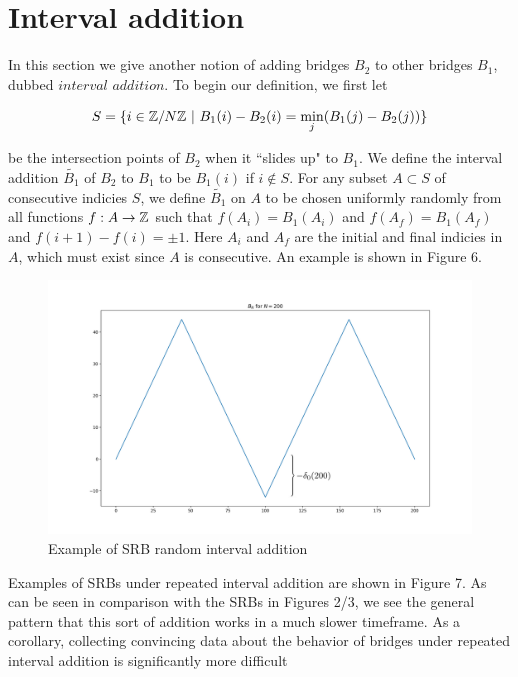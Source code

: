 \documentclass{article}
\theoremstyle{definition}
\begin{document}
\section{Interval addition}

In this section we give another notion of adding bridges $B_2$ to other bridges $B_1$, dubbed $\mathit{interval \,\,addition}$. To begin our definition, we first let

$$S=\{i\in \mathbb{Z}/N\mathbb{Z} \,\,|\,\, B_1(i)-B_2(i)=\min_j(B_1(j)-B_2(j))\}$$

be the intersection points of $B_2$ when it ``slides up" to $B_1$. We define the interval addition $\tilde{B_1}$ of $B_2$ to $B_1$ to be $B_1(i)$ if $i\not\in S$. For any subset $A\subset S$ of consecutive indicies $S$, we define $\tilde{B_1}$ on $A$ to be chosen uniformly randomly from all functions $f:A\to \mathbb{Z}$ such that $f(A_{i})=B_1(A_{i})$ and $f(A_{f})=B_1(A_{f})$ and $f(i+1)-f(i)=\pm1$. Here $A_i$ and $A_f$ are the initial and final indicies in $A$, which must exist since $A$ is consecutive. An example is shown in Figure 6.

\begin{figure}[h!]
\caption{Example of SRB random interval addition}
\centering
\includegraphics[width=.7\textwidth]{Figure_6}
\end{figure}


Examples of SRBs under repeated interval addition are shown in Figure 7. As can be seen in comparison with the SRBs in Figures 2/3, we see the general pattern that this sort of addition works in a much slower timeframe. As a corollary, collecting convincing data about the behavior of bridges under repeated interval addition is significantly more difficult
\end{document}
